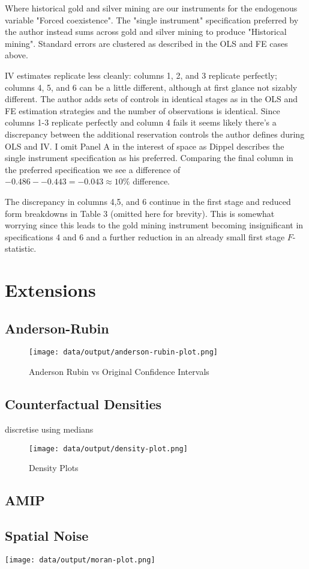 \documentclass{article}
\begin{document}
Where historical gold and silver mining are our instruments for the endogenous variable "Forced coexistence". The "single instrument" specification preferred by the author instead sums across gold and silver mining to produce "Historical mining".
Standard errors are clustered as described in the OLS and FE cases above.


IV estimates replicate less cleanly: columns 1, 2, and 3 replicate perfectly; columns 4, 5, and 6 can be a little different, although at first glance not sizably different. The author 
adds sets of controls in identical stages as in the OLS and FE estimation strategies and the number of observations is identical. Since columns 1-3 
replicate perfectly and column 4 fails it seems likely there's a discrepancy between the additional reservation controls the author defines during OLS
and IV. I omit Panel A in the interest of space as Dippel describes the single instrument specification as his preferred. Comparing the final column in the preferred specification 
we see a difference of $-0.486 - - 0.443 = -0.043 \approx 10\%$ difference.

% 


 The discrepancy in columns 4,5, and 6 continue in the first stage and reduced form breakdowns in Table 3 (omitted here for brevity). This is
somewhat worrying since this leads to the gold mining instrument becoming insignificant in specifications 4 and 6 and a further reduction in an already small 
first stage $F$-statistic. 

\section{Extensions}
\subsection*{Anderson-Rubin}
\begin{figure}[htbp]
    \centering
    \texttt{[image: data/output/anderson-rubin-plot.png]}
    \caption{Anderson Rubin vs Original Confidence Intervals}
    \label{AR}
\end{figure}

\subsection*{Counterfactual Densities}

discretise using medians
\begin{figure}[htbp]
    \centering
    \texttt{[image: data/output/density-plot.png]}
    \caption{Density Plots}
    \label{dens}
\end{figure}

\subsection*{AMIP}

\subsection*{Spatial Noise}


\texttt{[image: data/output/moran-plot.png]}
\end{document}
